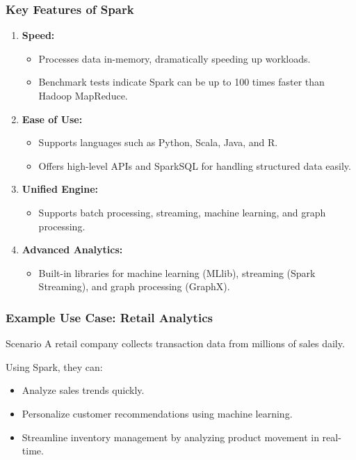 \documentclass[aspectratio=169]{beamer}
\begin{document}
\begin{frame}[fragile]
    \frametitle{Key Features of Spark}
    \begin{enumerate}
        \item \textbf{Speed:}
        \begin{itemize}
            \item Processes data in-memory, dramatically speeding up workloads.
            \item Benchmark tests indicate Spark can be up to 100 times faster than Hadoop MapReduce.
        \end{itemize}
        
        \item \textbf{Ease of Use:}
        \begin{itemize}
            \item Supports languages such as Python, Scala, Java, and R.
            \item Offers high-level APIs and SparkSQL for handling structured data easily.
        \end{itemize}
        
        \item \textbf{Unified Engine:}
        \begin{itemize}
            \item Supports batch processing, streaming, machine learning, and graph processing.
        \end{itemize}
        
        \item \textbf{Advanced Analytics:}
        \begin{itemize}
            \item Built-in libraries for machine learning (MLlib), streaming (Spark Streaming), and graph processing (GraphX).
        \end{itemize}
    \end{enumerate}
\end{frame}

\begin{frame}[fragile]
    \frametitle{Example Use Case: Retail Analytics}
    \begin{block}{Scenario}
        A retail company collects transaction data from millions of sales daily.
    \end{block}
    Using Spark, they can:
    \begin{itemize}
        \item Analyze sales trends quickly.
        \item Personalize customer recommendations using machine learning.
        \item Streamline inventory management by analyzing product movement in real-time.
    \end{itemize}
\end{frame}
\end{document}
